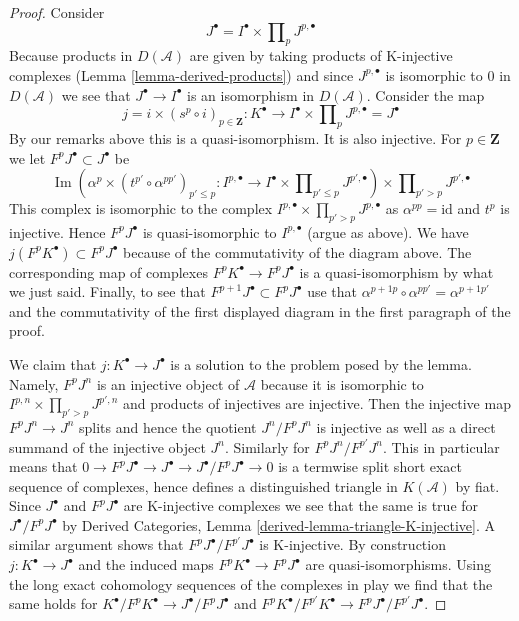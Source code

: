 \documentclass{amsart}
\theoremstyle{plain}
\theoremstyle{definition}
\theoremstyle{remark}
\numberwithin{equation}{subsection}
\def\Im{\mathop{\mathrm{Im}}}
\begin{document}
\begin{proof}
\medskip\noindent
Consider
$$
J^\bullet = I^\bullet \times \prod\nolimits_p J^{p, \bullet}
$$
Because products in $D(\mathcal{A})$ are given by taking
products of K-injective complexes
(Lemma \ref{lemma-derived-products})
and since $J^{p, \bullet}$
is isomorphic to $0$ in $D(\mathcal{A})$ we see that
$J^\bullet \to I^\bullet$ is an isomorphism in $D(\mathcal{A})$.
Consider the map
$$
j = i \times (s^p \circ i)_{p \in \mathbf{Z}} :
K^\bullet
\longrightarrow
I^\bullet \times \prod\nolimits_p J^{p, \bullet} = J^\bullet
$$
By our remarks above this is a quasi-isomorphism. It is also injective.
For $p \in \mathbf{Z}$ we let $F^pJ^\bullet \subset J^\bullet$ be
$$
\Im\left(
\alpha^p \times (t^{p'} \circ \alpha^{pp'})_{p' \leq p} :
I^{p, \bullet}
\to
I^\bullet \times \prod\nolimits_{p' \leq p} J^{p', \bullet}
\right)
\times \prod\nolimits_{p' > p} J^{p', \bullet}
$$
This complex is isomorphic to the complex
$I^{p, \bullet} \times \prod_{p' > p} J^{p, \bullet}$
as $\alpha^{pp} = \text{id}$ and $t^p$ is injective.
Hence $F^pJ^\bullet$ is quasi-isomorphic to $I^{p, \bullet}$ (argue
as above). We have $j(F^pK^\bullet) \subset F^pJ^\bullet$ because
of the commutativity of the diagram above. The corresponding
map of complexes $F^pK^\bullet \to F^pJ^\bullet$ is a quasi-isomorphism
by what we just said. Finally, to see that
$F^{p + 1}J^\bullet \subset F^pJ^\bullet$
use that $\alpha^{p + 1p} \circ \alpha^{pp'} = \alpha^{p + 1p'}$
and the commutativity of the first displayed diagram
in the first paragraph of the proof.

\medskip\noindent
We claim that $j : K^\bullet \to J^\bullet$ is a solution to the
problem posed by the lemma. Namely, $F^pJ^n$ is an injective object
of $\mathcal{A}$ because it is isomorphic to
$I^{p, n} \times \prod_{p' > p} J^{p', n}$ and products of
injectives are injective. Then the injective map $F^pJ^n \to J^n$
splits and hence the quotient $J^n/F^pJ^n$ is injective as well
as a direct summand of the injective object $J^n$.
Similarly for $F^pJ^n/F^{p'}J^n$. This in particular means
that $0 \to F^pJ^\bullet \to J^\bullet \to J^\bullet/F^pJ^\bullet \to 0$
is a termwise split short exact sequence of complexes, hence defines
a distinguished triangle in $K(\mathcal{A})$ by fiat.
Since $J^\bullet$ and $F^pJ^\bullet$ are K-injective complexes
we see that the same is true for $J^\bullet/F^pJ^\bullet$
by Derived Categories, Lemma \ref{derived-lemma-triangle-K-injective}.
A similar argument shows that $F^pJ^\bullet/F^{p'}J^\bullet$
is K-injective. By construction $j : K^\bullet \to J^\bullet$
and the induced maps $F^pK^\bullet \to F^pJ^\bullet$ are
quasi-isomorphisms. Using the long exact cohomology sequences
of the complexes in play we find that the same holds for
$K^\bullet/F^pK^\bullet \to J^\bullet/F^pJ^\bullet$ and
$F^pK^\bullet/F^{p'}K^\bullet \to F^pJ^\bullet/F^{p'}J^\bullet$.
\end{proof}
\end{document}
